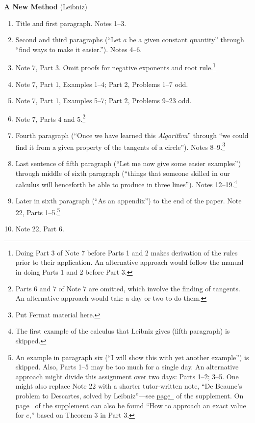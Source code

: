 \documentclass[10pt]{article}
\begin{document}
\textbf{A New Method} (Leibniz)
\begin{enumerate}[resume*] \item Title and first paragraph.
		Notes 1--3.  \item Second and third
		paragraphs (``Let $a$ be a given constant
		quantity'' through ``find ways to make it
		easier.''). Notes 4--6.  \item Note 7, Part
		3. Omit proofs for negative exponents and
		root rule.\footnote{Doing Part 3 of Note 7
			before Parts 1 and 2 makes
			derivation of the rules prior to
			their application. An alternative
			approach would follow the manual in
			doing Parts 1 and 2 before Part 3.}
	\item Note 7, Part 1, Examples 1--4; Part 2,
		Problems 1--7 odd.  \item Note 7, Part 1,
		Examples 5--7; Part 2, Problems 9--23 odd.
	\item Note 7, Parts 4 and 5.\footnote{Parts 6 and 7
			of Note 7 are omitted, which involve
			the finding of tangents. An
			alternative approach would take a
			day or two to do them.} \item Fourth
		paragraph (``Once we have learned this
		\emph{Algorithm}'' through ``we could find
		it from a given property of the tangents of
		a circle'').  Notes 8--9.\footnote{Put Fermat material here.}
\item Last
		sentence of fifth paragraph (``Let me now
		give some easier examples'') through middle
		of sixth paragraph (``things that someone
		skilled in our calculus will henceforth be
		able to produce in three lines''). Notes
		12--19.\footnote{The first example of the
			calculus that Leibniz gives (fifth
			paragraph) is
			skipped.} \item Later in sixth
		paragraph (``As an appendix'') to the end of
		the paper.  Note 22, Parts 1--5.\footnote{An
			example in paragraph six (``I will
			show this with yet another
			example'') is skipped. Also, Parts
			1--5 may be too much for a single
			day. An alternative approach might
			divide this assignment over two
			days: Parts 1--2; 3--5. One might
			also replace Note 22 with a shorter
		tutor-written note, ``De Beaune’s problem to
		Descartes, solved by Leibniz''---see
		\hyperref[supple.14]{page~\pageref{supple.14}}
		of the supplement. On
	\hyperref[supple.20]{page~\pageref{supple.20}} of
	the supplement can also be found ``How to approach an
	exact value for $e$,'' based on Theorem 3 in Part
	3.} \item Note
		22, Part 6.  \end{enumerate}
	 
\end{document}

